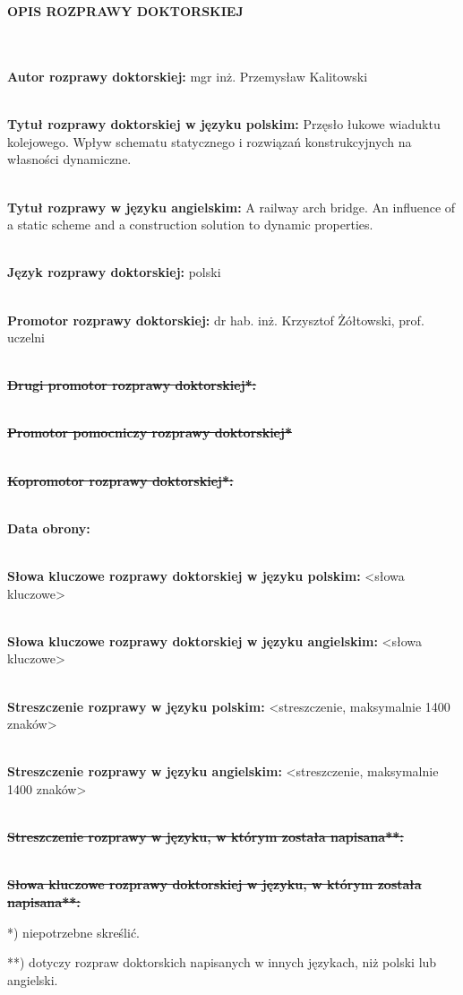 \begin{myfont}
	
	\noindent
	\\ \\	
	\textbf{OPIS ROZPRAWY DOKTORSKIEJ}
	
\footnotesize \noindent
	\\ \\
\textbf{Autor rozprawy doktorskiej:} mgr inż. Przemysław Kalitowski

 \noindent
\\
\textbf{Tytuł rozprawy doktorskiej w języku polskim:} Przęsło łukowe wiaduktu kolejowego. Wpływ schematu statycznego i rozwiązań konstrukcyjnych na własności dynamiczne.

 \noindent
\\
\textbf{Tytuł rozprawy w języku angielskim:} A railway arch bridge. An influence of a static scheme and a construction solution to dynamic properties.

 \noindent
\\
\textbf{Język rozprawy doktorskiej:} polski

 \noindent
\\
\textbf{Promotor rozprawy doktorskiej:} dr hab. inż. Krzysztof Żółtowski, prof. uczelni

 \noindent
\\
{\bfseries \sout{Drugi promotor rozprawy doktorskiej*:}}

 \noindent
\\
{\bfseries \sout{Promotor pomocniczy rozprawy doktorskiej*}}

 \noindent
\\
{\bfseries \sout{Kopromotor rozprawy doktorskiej*:}}

 \noindent
\\
\textbf{Data obrony:}

 \noindent
\\
\textbf{Słowa kluczowe rozprawy doktorskiej w języku polskim:} <słowa kluczowe>

 \noindent
\\
\textbf{Słowa kluczowe rozprawy doktorskiej w języku angielskim:} <słowa kluczowe>

\noindent
\\
\textbf{Streszczenie rozprawy w języku polskim:} <streszczenie, maksymalnie 1400 znaków>

\noindent
\\
\textbf{Streszczenie rozprawy w języku angielskim:} <streszczenie, maksymalnie 1400 znaków>

\noindent
\\
{\bfseries \sout{Streszczenie rozprawy w języku, w którym została napisana**:}}

\noindent
\\
{\bfseries \sout{Słowa kluczowe rozprawy doktorskiej w języku, w którym została napisana**:}}
\bigskip

*) niepotrzebne skreślić.

**) dotyczy rozpraw doktorskich napisanych w innych językach, niż polski lub angielski.
\vfill
\pagebreak[4]
\end{myfont}

